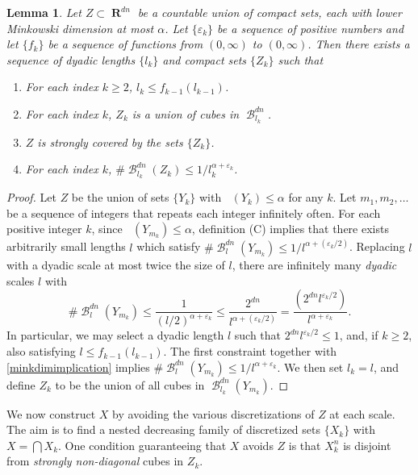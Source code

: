 \documentclass[dvipsnames,letterpaper,12pt]{article}
\numberwithin{equation}{section}
\theoremstyle{plain}
\newtheorem{lemma}{Lemma}
\DeclareMathOperator{\lowminkdim}{\underline{\dim}_{\mathbf{M}}}
\DeclareMathOperator{\RR}{\mathbf{R}}
\DeclareMathOperator{\B}{\mathcal{B}}
\begin{document}
\begin{lemma} \label{coveringlemma}
	Let $Z \subset \RR^{dn}$ be a countable union of compact sets, each with lower Minkowski dimension at most $\alpha$. Let $\{ \varepsilon_k \}$ be a sequence of positive numbers and let $\{ f_k \}$ be a sequence of functions from $(0,\infty)$ to $(0,\infty)$. Then there exists a sequence of dyadic lengths $\{ l_k \}$ and compact sets $\{ Z_k \}$ such that
	\begin{enumerate}
		\item For each index $k \geq 2$, $l_k \leq f_{k-1}(l_{k-1})$.
		\item For each index $k$, $Z_k$ is a union of cubes in $\B^{dn}_{l_k}$.
		\item $Z$ is strongly covered by the sets $\{ Z_k \}$.
		\item For each index $k$, $\# \B^{dn}_{l_k}(Z_k) \leq 1/l_k^{\alpha + \varepsilon_k}$.
	\end{enumerate}
\end{lemma}
\begin{proof}
	Let $Z$ be the union of sets $\{ Y_k \}$ with $\lowminkdim(Y_k) \leq \alpha$ for any $k$. Let $m_1, m_2, \dots$ be a sequence of integers that repeats each integer infinitely often. For each positive integer $k$, since $\lowminkdim(Y_{m_k}) \leq \alpha$, definition (C) implies that there exists arbitrarily small lengths $l$ which satisfy $\# \B_l^{dn}(Y_{m_k}) \leq 1/l^{\alpha + (\varepsilon_k/2)}$. Replacing $l$ with a dyadic scale at most twice the size of $l$, there are infinitely many {\it dyadic} scales $l$ with
	\begin{equation} \label{minkdimimplication}
		\# \B^{dn}_l(Y_{m_k}) \leq \frac{1}{(l/2)^{\alpha + \varepsilon_k}} \leq \frac{2^{dn}}{l^{\alpha + (\varepsilon_k/2)}} = \frac{\left( 2^{dn} l^{\varepsilon_k/2} \right)}{l^{\alpha + \varepsilon_k}}.
	\end{equation}
	In particular, we may select a dyadic length $l$ such that $2^{dn} l^{\varepsilon_k/2} \leq 1$, and, if $k \geq 2$, also satisfying $l \leq f_{k-1}(l_{k-1})$. The first constraint together with \eqref{minkdimimplication} implies $\# \B^{dn}_l(Y_{m_k}) \leq 1/l^{\alpha + \varepsilon_k}$. We then set $l_k = l$, and define $Z_k$ to be the union of all cubes in $\B_{l_k}^{dn}(Y_{m_k})$.
\end{proof}

We now construct $X$ by avoiding the various discretizations of $Z$ at each scale. The aim is to find a nested decreasing family of discretized sets $\{ X_k \}$ with $X = \bigcap X_k$. One condition guaranteeing that $X$ avoids $Z$ is that $X_k^n$ is disjoint from {\it strongly non-diagonal} cubes in $Z_k$.
\end{document}
